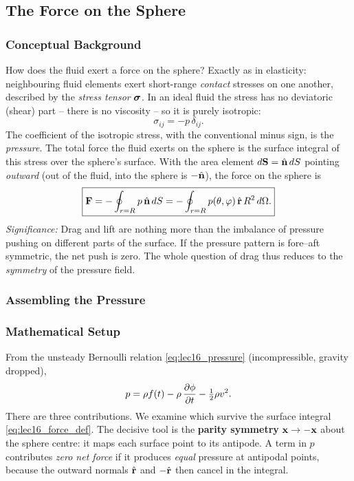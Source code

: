 \documentclass[../main.tex]{subfiles}
\begin{document}
\subsection{The Force on the Sphere}\label{sec:lec16:force}

\subsubsection*{Conceptual Background}
How does the fluid exert a force on the sphere? Exactly as in elasticity: neighbouring fluid elements exert short-range \emph{contact} stresses on one another, described by the \emph{stress tensor} $\boldsymbol{\sigma}$. In an ideal fluid the stress has no deviatoric (shear) part -- there is no viscosity -- so it is purely isotropic:
\begin{equation}
  \sigma_{ij} = -p\,\delta_{ij}.
  \label{eq:lec16_stress_ideal}
\end{equation}
The coefficient of the isotropic stress, with the conventional minus sign, is the \emph{pressure}. The total force the fluid exerts on the sphere is the surface integral of this stress over the sphere's surface. With the area element $d\mathbf{S}=\hat{\mathbf{n}}\,dS$ pointing \emph{outward} (out of the fluid, into the sphere is $-\hat{\mathbf{n}}$), the force on the sphere is
\begin{equation}
  \boxed{\mathbf{F} = -\oint_{r=R} p\,\hat{\mathbf{n}}\,dS = -\oint_{r=R} p(\theta,\varphi)\,\hat{\mathbf{r}}\,R^2\,d\Omega.}
  \label{eq:lec16_force_def}
\end{equation}
\textit{Significance:} Drag and lift are nothing more than the imbalance of pressure pushing on different parts of the surface. If the pressure pattern is fore--aft symmetric, the net push is zero. The whole question of drag thus reduces to the \emph{symmetry} of the pressure field.

\subsubsection{Assembling the Pressure}

\subsubsection*{Mathematical Setup}
From the unsteady Bernoulli relation \eqref{eq:lec16_pressure} (incompressible, gravity dropped),
\begin{equation}
  p = \rho f(t) - \rho\,\pdv{\phi}{t} - \tfrac{1}{2}\rho v^2.
  \label{eq:lec16_p_three}
\end{equation}
There are three contributions. We examine which survive the surface integral \eqref{eq:lec16_force_def}. The decisive tool is the \textbf{parity symmetry} $\mathbf{x}\to-\mathbf{x}$ about the sphere centre: it maps each surface point to its antipode. A term in $p$ contributes \emph{zero net force} if it produces \emph{equal} pressure at antipodal points, because the outward normals $\hat{\mathbf{r}}$ and $-\hat{\mathbf{r}}$ then cancel in the integral.
\end{document}
